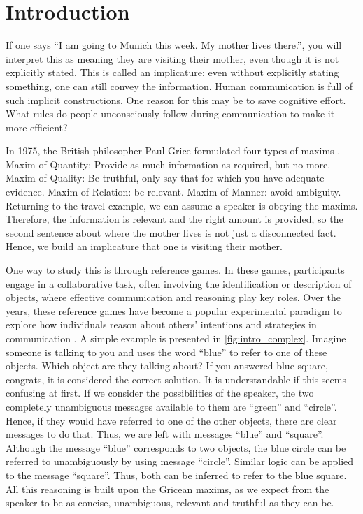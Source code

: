 \section*{Introduction} \label{sec:intro}
If one says ``I am going to Munich this week. My mother lives there.'', you will interpret this as meaning they are visiting their mother, even though it is not explicitly stated. This is called an implicature: even without explicitly stating something, one can still convey the information. Human communication is full of such implicit constructions. One reason for this may be to save cognitive effort. What rules do people unconsciously follow during communication to make it more efficient?

In 1975, the British philosopher Paul Grice formulated four types of maxims \citep{Grice_1975}. Maxim of Quantity: Provide as much information as required, but no more. Maxim of Quality: Be truthful, only say that for which you have adequate evidence. Maxim of Relation: be relevant. Maxim of Manner: avoid ambiguity. Returning to the travel example, we can assume a speaker is obeying the maxims. Therefore, the information is relevant and the right amount is provided, so the second sentence about where the mother lives is not just a disconnected fact. Hence, we build an implicature that one is visiting their mother.

One way to study this is through reference games. In these games, participants engage in a collaborative task, often involving the identification or description of objects, where effective communication and reasoning play key roles. Over the years, these reference games have become a popular experimental paradigm to explore how individuals reason about others' intentions and strategies in communication \citep{Frank_2012,Franke_2016}. A simple example is presented in \autoref{fig:intro_complex}. Imagine someone is talking to you and uses the word ``blue'' to refer to one of these objects. Which object are they talking about? If you answered blue square, congrats, it is considered the correct solution. It is understandable if this seems confusing at first. If we consider the possibilities of the speaker, the two completely unambiguous messages available to them are ``green'' and ``circle''. Hence, if they would have referred to one of the other objects, there are clear messages to do that. Thus, we are left with messages ``blue'' and ``square''. Although the message ``blue'' corresponds to two objects, the blue circle can be referred to unambiguously by using message ``circle''. Similar logic can be applied to the message ``square''. Thus, both can be inferred to refer to the blue square. All this reasoning is built upon the Gricean maxims, as we expect from the speaker to be as concise, unambiguous, relevant and truthful as they can be. 

